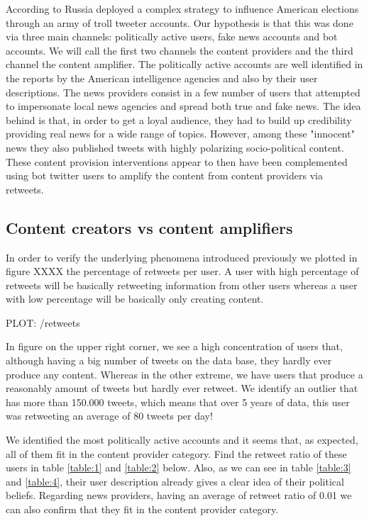 \documentclass[12pt, authoryear]{elsarticle}
\begin{document}
According to \cite{mueller2019report} Russia deployed a complex strategy to influence American elections through an army of troll tweeter accounts. Our hypothesis is that this was done via three main channels: politically active users, fake news accounts and bot accounts. We will call the first two channels the content providers and the third channel the content amplifier. The politically active accounts are well identified in the reports by the American intelligence agencies and also by their user descriptions. The news providers consist in a few number of users that attempted to impersonate local news agencies and spread both true and fake news. The idea behind is that, in order to get a loyal audience, they had to build up credibility providing real news for a wide range of topics. However, among these "innocent" news they also published tweets with highly polarizing socio-political content. These content provision interventions appear to then have been complemented using bot twitter users to amplify the content from content providers via retweets. 

\subsection{Content creators vs content amplifiers}

In order to verify the underlying phenomena introduced previously we plotted in figure XXXX the percentage of retweets per user. A user with high percentage of retweets will be basically retweeting information from other users whereas a user with low percentage will be basically only creating content. 

PLOT: /retweets

In figure on the upper right corner, we see a high concentration of users that, although having a big number of tweets on the data base, they hardly ever produce any content. Whereas in the other extreme, we have users that produce a reasonably amount of tweets but hardly ever retweet. We identify an outlier that has more than 150.000 tweets, which means that over 5 years of data, this user was retweeting an average of 80 tweets per day!

We identified the most politically active accounts and it seems that, as expected, all of them fit in the content provider category. Find the retweet ratio of these users in table \ref{table:1} and \ref{table:2} below. Also, as we can see in table \ref{table:3} and \ref{table:4}, their user description already gives a clear idea of their political beliefs.
Regarding news providers, having an average of retweet ratio of 0.01 we can also confirm that they fit in the content provider category.
\end{document}
